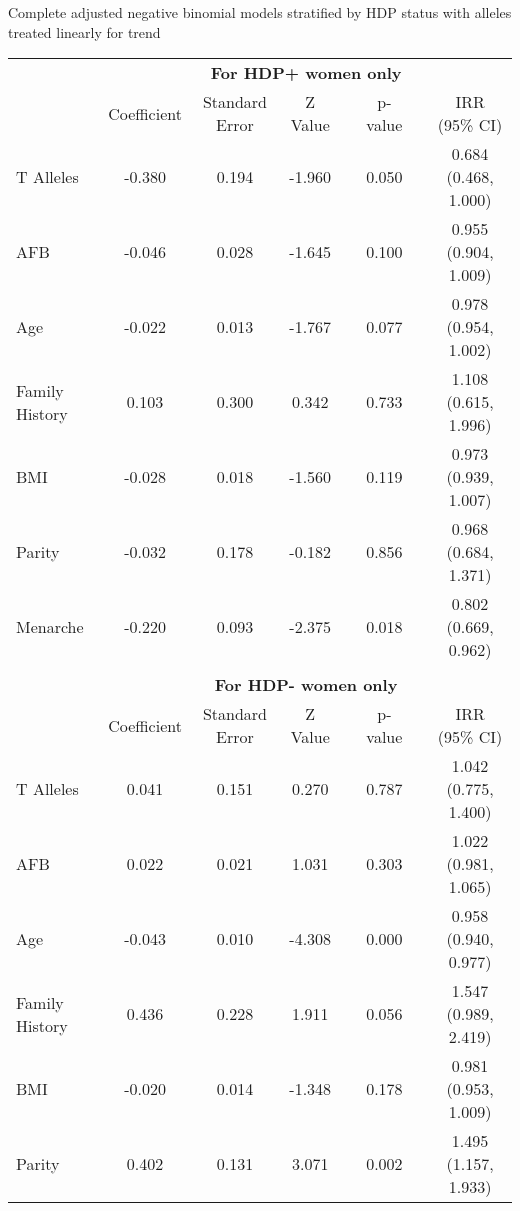 \documentclass{standalone}
\begin{document}
\begin{threeparttable}
\caption{Complete adjusted negative binomial models stratified by HDP status with alleles treated linearly for trend}
\begin{tabular}{@{}lccccccc@{}}
  \toprule
& \multicolumn{7}{c}{\textbf{For HDP+ women only}} \\
   \cmidrule{2-8}
     & Coefficient & Standard Error & Z Value & \hspace{1em} & p-value & \hspace{1em} & IRR (95\% CI) \\ 
  \midrule
  T Alleles\phantom{abcdefghijklm} & -0.380 & 0.194 & -1.960 && 0.050 && 0.684 (0.468, 1.000) \\ 
  AFB & -0.046 & 0.028 & -1.645 && 0.100 && 0.955 (0.904, 1.009) \\ 
  Age & -0.022 & 0.013 & -1.767 && 0.077 && 0.978 (0.954, 1.002) \\ 
  Family History & 0.103 & 0.300 & 0.342 && 0.733 && 1.108 (0.615, 1.996) \\ 
  BMI & -0.028 & 0.018 & -1.560 && 0.119 && 0.973 (0.939, 1.007) \\ 
  Parity & -0.032 & 0.178 & -0.182 && 0.856 && 0.968 (0.684, 1.371) \\ 
  Menarche & -0.220 & 0.093 & -2.375 && 0.018 && 0.802 (0.669, 0.962) \\
  \\
  & \multicolumn{7}{c}{\textbf{For HDP- women only}} \\
   \cmidrule{2-8}
     & Coefficient & Standard Error & Z Value & \hspace{1em} & p-value & \hspace{1em} & IRR (95\% CI) \\ 
  \midrule
   T Alleles\phantom{abcdefghijklm} & 0.041 & 0.151 & 0.270 && 0.787 && 1.042 (0.775, 1.400) \\ 
  AFB & 0.022 & 0.021 & 1.031 && 0.303 && 1.022 (0.981, 1.065) \\ 
  Age & -0.043 & 0.010 & -4.308 && 0.000 && 0.958 (0.940, 0.977) \\ 
  Family History & 0.436 & 0.228 & 1.911 && 0.056 && 1.547 (0.989, 2.419) \\ 
  BMI & -0.020 & 0.014 & -1.348 && 0.178 && 0.981 (0.953, 1.009) \\ 
  Parity & 0.402 & 0.131 & 3.071 && 0.002 && 1.495 (1.157, 1.933) \\ 

\end{tabular}
\end{threeparttable}
\end{document}
